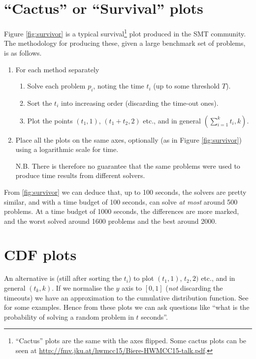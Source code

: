 \section{``Cactus'' or ``Survival'' plots}
Figure \ref{fig:survivor} is a typical survival\footnote{``Cactus'' plots are the same with the axes flipped. Some cactus plots can be seen at \url{http://fmv.jku.at/hwmcc15/Biere-HWMCC15-talk.pdf}.} plot produced in the SMT community.
The methodology for producing these, given a large benchmark set of problems, is as follows.
\begin{enumerate}
\item For each method separately
\begin{enumerate}
\item Solve each problem $p_i$, noting the time $t_i$ (up to some threshold $T$).
\item Sort the $t_i$ into increasing order (discarding the time-out ones).
\item Plot the points $(t_1,1)$, $(t_1+t_2,2)$ etc., and in general $(\sum_{i=1}^kt_i,k)$.
\end{enumerate}
\item Place all the plots on the same axes, optionally (as in Figure \ref{fig:survivor}) using a logarithmic scale for time.
\item[N.B.]There is therefore no guarantee that the same problems were used to produce time results from different solvers.
\end{enumerate}
From \ref{fig:survivor} we can deduce that, up to 100 seconds, the solvers are pretty similar, and with a time budget of 100 seconds, can solve \emph{at most} around 500 problems. At a time budget of 1000 seconds, the differences are more marked, and the worst solved around 1600 problems and the best around 2000.
\section{CDF plots}
An alternative is (still after sorting the $t_i$) to plot  $(t_1,1)$, $t_2,2)$ etc., and in general $(t_k,k)$. If we normalise the $y$ axis to $[0,1]$ (\emph{not} discarding the timeouts) we have an approximation to the cumulative distribution function. See \cite{Xuetal2008b} for some examples. Hence from these plots we can ask questions like ``what is the probability of solving a random problem in $t$ seconds''.
